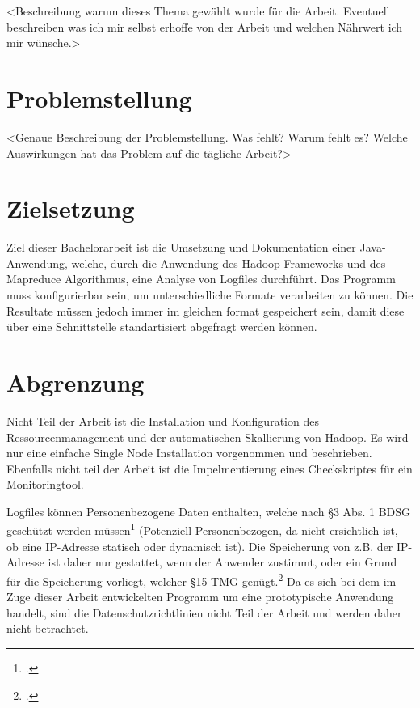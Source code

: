 <Beschreibung warum dieses Thema gewählt wurde für die Arbeit. Eventuell beschreiben was ich mir selbst erhoffe von der Arbeit und welchen Nährwert ich mir wünsche.>

\section{Problemstellung}\label{sec:Problemstellung}
<Genaue Beschreibung der Problemstellung. Was fehlt? Warum fehlt es? Welche Auswirkungen hat das Problem auf die tägliche Arbeit?>

\section{Zielsetzung}\label{sec:Zielsetzung}
Ziel dieser Bachelorarbeit ist die Umsetzung und Dokumentation einer Java-Anwendung, welche, durch die Anwendung des Hadoop Frameworks und des Mapreduce Algorithmus, eine Analyse von Logfiles durchführt. Das Programm muss konfigurierbar sein, um unterschiedliche Formate verarbeiten zu können. Die  Resultate müssen jedoch immer im gleichen format gespeichert sein, damit diese über eine Schnittstelle standartisiert abgefragt werden können.

\section{Abgrenzung}\label{sec:Abgrenzung}
Nicht Teil der Arbeit ist die Installation und Konfiguration des Ressourcenmanagement und der automatischen Skallierung von Hadoop. Es wird nur eine einfache Single Node Installation vorgenommen und beschrieben. Ebenfalls nicht teil der Arbeit ist die Impelmentierung eines Checkskriptes für ein Monitoringtool.

Logfiles können Personenbezogene Daten enthalten, welche nach §3 Abs. 1 \ac{BDSG} geschützt werden müssen\footcite[§3 Abs. 1 BDSG,][]{BDSG3.1990} (Potenziell Personenbezogen, da nicht ersichtlich ist, ob eine \ac{IP}-Adresse statisch oder dynamisch ist). Die Speicherung von z.B. der \ac{IP}-Adresse ist daher nur gestattet, wenn der Anwender zustimmt, oder ein Grund für die Speicherung vorliegt, welcher §15 \ac{TMG} genügt.\footcite[§15 TMG,][]{TMG15.2007}  Da es sich bei dem im Zuge dieser Arbeit entwickelten Programm um eine prototypische Anwendung handelt, sind die Datenschutzrichtlinien nicht Teil der Arbeit und werden daher nicht betrachtet.

